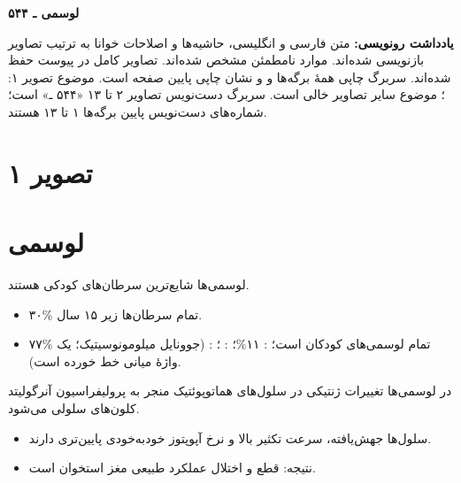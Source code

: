 \documentclass[12pt,a4paper]{article}
\begin{document}
\fi
\providecommand{\LeukemiaUnclear}[1]{\textbf{[خوانش نامطمئن: #1]}}
\providecommand{\LeukemiaPage}[1]{\clearpage\section*{تصویر #1}}
\providecommand{\LeukemiaMath}[1]{\lr{\(#1\)}}
%
  {\gdef\LeukemiaImagePath{pediatrics/ped-hematology & oncology/leukemia/images/}}

\begin{center}
{\Large\bfseries لوسمی ـ ۵۴۴}\par
{}
\end{center}
\textbf{یادداشت رونویسی:} متن فارسی و انگلیسی، حاشیه‌ها و اصلاحات خوانا به ترتیب تصاویر بازنویسی شده‌اند. موارد نامطمئن مشخص شده‌اند. تصاویر کامل در پیوست حفظ شده‌اند. سربرگ چاپی همهٔ برگه‌ها  و  و نشان چاپی پایین صفحه  است. موضوع تصویر ۱: ؛ موضوع سایر تصاویر خالی است. سربرگ دست‌نویس تصاویر ۲ تا ۱۳ «۵۴۴ ـ» است؛ شماره‌های دست‌نویس پایین برگه‌ها ۱ تا ۱۳ هستند.

\LeukemiaPage{۱}
\section*{لوسمی}
لوسمی‌ها شایع‌ترین سرطان‌های کودکی هستند.
\begin{itemize}
\item ۳۰\% تمام سرطان‌ها زیر ۱۵ سال.
\item ۷۷\% تمام لوسمی‌های کودکان  است؛ : ۱۱\%؛ : ؛ :  (جوونایل میلومونوسیتیک؛ یک واژهٔ میانی خط خورده است).
\end{itemize}
در لوسمی‌ها تغییرات ژنتیکی در سلول‌های هماتوپوئتیک منجر به پرولیفراسیون آنرگولیتد کلون‌های سلولی می‌شود.
\begin{itemize}
\item سلول‌ها جهش‌یافته، سرعت تکثیر بالا و نرخ آپوپتوز خودبه‌خودی پایین‌تری دارند.
\item نتیجه: قطع و اختلال عملکرد طبیعی مغز استخوان است.
\end{itemize}
\end{document}
